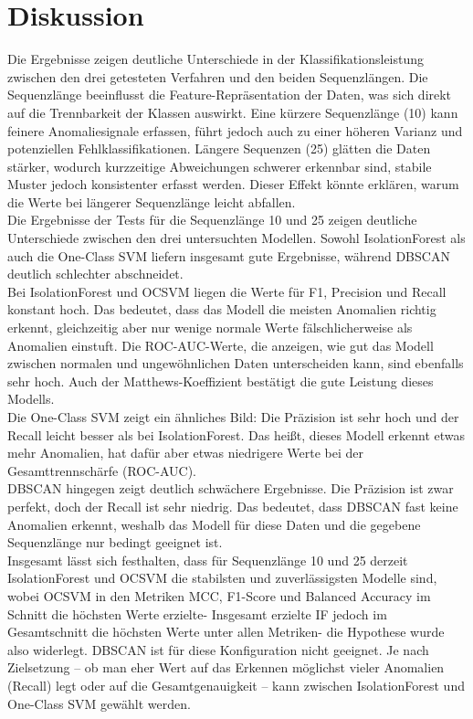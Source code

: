 \documentclass[a4paper,12pt]{article}
\begin{document}
	\section{Diskussion}
	Die Ergebnisse zeigen deutliche Unterschiede in der Klassifikationsleistung zwischen den drei getesteten Verfahren und den beiden Sequenzlängen. Die Sequenzlänge beeinflusst die Feature-Repräsentation der Daten, was sich direkt auf die Trennbarkeit der Klassen auswirkt. Eine kürzere Sequenzlänge (10) kann feinere Anomaliesignale erfassen, führt jedoch auch zu einer höheren Varianz und potenziellen Fehlklassifikationen. Längere Sequenzen (25) glätten die Daten stärker, wodurch kurzzeitige Abweichungen schwerer erkennbar sind, stabile Muster jedoch konsistenter erfasst werden. Dieser Effekt könnte erklären, warum die Werte bei längerer Sequenzlänge leicht abfallen.
	\\[0.5em]
	Die Ergebnisse der Tests für die Sequenzlänge 10 und 25 zeigen deutliche Unterschiede zwischen den drei untersuchten Modellen. Sowohl IsolationForest als auch die One-Class SVM liefern insgesamt gute Ergebnisse, während DBSCAN deutlich schlechter abschneidet.
	\\[0.5em]
	Bei IsolationForest und OCSVM liegen die Werte für F1, Precision und Recall konstant hoch. Das bedeutet, dass das Modell die meisten Anomalien richtig erkennt, gleichzeitig aber nur wenige normale Werte fälschlicherweise als Anomalien einstuft. Die ROC-AUC-Werte, die anzeigen, wie gut das Modell zwischen normalen und ungewöhnlichen Daten unterscheiden kann, sind ebenfalls sehr hoch. Auch der Matthews-Koeffizient bestätigt die gute Leistung dieses Modells.
	\\[0.5em]
	Die One-Class SVM zeigt ein ähnliches Bild: Die Präzision ist sehr hoch und der Recall leicht besser als bei IsolationForest. Das heißt, dieses Modell erkennt etwas mehr Anomalien, hat dafür aber etwas niedrigere Werte bei der Gesamttrennschärfe (ROC-AUC).
	\\[0.5em]
	DBSCAN hingegen zeigt deutlich schwächere Ergebnisse. Die Präzision ist zwar perfekt, doch der Recall ist sehr niedrig. Das bedeutet, dass DBSCAN fast keine Anomalien erkennt, weshalb das Modell für diese Daten und die gegebene Sequenzlänge nur bedingt geeignet ist.
	\\[0.5em]
	Insgesamt lässt sich festhalten, dass für Sequenzlänge 10 und 25 derzeit IsolationForest und OCSVM die stabilsten und zuverlässigsten Modelle sind, wobei OCSVM in den Metriken MCC, F1-Score und Balanced Accuracy im Schnitt die höchsten Werte erzielte- Insgesamt erzielte IF jedoch im Gesamtschnitt die höchsten Werte unter allen Metriken- die Hypothese wurde also widerlegt. DBSCAN ist für diese Konfiguration nicht geeignet. Je nach Zielsetzung – ob man eher Wert auf das Erkennen möglichst vieler Anomalien (Recall) legt oder auf die Gesamtgenauigkeit – kann zwischen IsolationForest und One-Class SVM gewählt werden.
\end{document}
